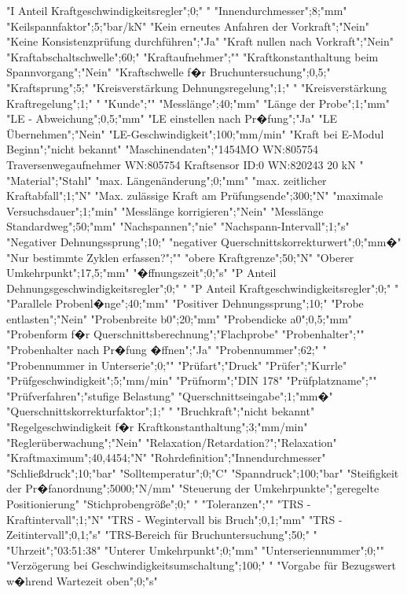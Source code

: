 "I Anteil Kraftgeschwindigkeitsregler";0;" "
"Innendurchmesser";8;"mm"
"Keilspannfaktor";5;"bar/kN"
"Kein erneutes Anfahren der Vorkraft";"Nein"
"Keine Konsistenzprüfung durchführen";"Ja"
"Kraft nullen nach Vorkraft";"Nein"
"Kraftabschaltschwelle";60;"%
"Kraftaufnehmer";""
"Kraftkonstanthaltung beim Spannvorgang";"Nein"
"Kraftschwelle f�r Bruchuntersuchung";0,5;"%
"Kraftsprung";5;"%
"Kreisverstärkung Dehnungsregelung";1;" "
"Kreisverstärkung Kraftregelung";1;" "
"Kunde";""
"Messlänge";40;"mm"
"Länge der Probe";1;"mm"
"LE - Abweichung";0,5;"mm"
"LE einstellen nach Pr�fung";"Ja"
"LE Übernehmen";"Nein"
"LE-Geschwindigkeit";100;"mm/min"
"Kraft bei E-Modul Beginn";"nicht bekannt"
"Maschinendaten";"1454MO WN:805754
Traversenwegaufnehmer WN:805754
Kraftsensor ID:0 WN:820243 20 kN
"
"Material";"Stahl"
"max. Längenänderung";0;"mm"
"max. zeitlicher Kraftabfall";1;"N"
"Max. zulässige Kraft am Prüfungsende";300;"N"
"maximale Versuchsdauer";1;"min"
"Messlänge korrigieren";"Nein"
"Messlänge Standardweg";50;"mm"
"Nachspannen";"nie"
"Nachspann-Intervall";1;"s"
"Negativer Dehnungssprung";10;"%
"negativer Querschnittskorrekturwert";0;"mm�"
"Nur bestimmte Zyklen erfassen?";""
"obere Kraftgrenze";50;"N"
"Oberer Umkehrpunkt";17,5;"mm"
"�ffnungszeit";0;"s"
"P Anteil Dehnungsgeschwindigkeitsregler";0;" "
"P Anteil Kraftgeschwindigkeitsregler";0;" "
"Parallele Probenl�nge";40;"mm"
"Positiver Dehnungssprung";10;"%
"Probe entlasten";"Nein"
"Probenbreite b0";20;"mm"
"Probendicke a0";0,5;"mm"
"Probenform f�r Querschnittsberechnung";"Flachprobe"
"Probenhalter";""
"Probenhalter nach Pr�fung �ffnen";"Ja"
"Probennummer";62;" "
"Probennummer in Unterserie";0;""
"Prüfart";"Druck"
"Prüfer";"Kurrle"
"Prüfgeschwindigkeit";5;"mm/min"
"Prüfnorm";"DIN 178"
"Prüfplatzname";""
"Prüfverfahren";"stufige Belastung"
"Querschnittseingabe";1;"mm�"
"Querschnittskorrekturfaktor";1;" "
"Bruchkraft";"nicht bekannt"
"Regelgeschwindigkeit f�r Kraftkonstanthaltung";3;"mm/min"
"Reglerüberwachung";"Nein"
"Relaxation/Retardation?";"Relaxation"
"Kraftmaximum";40,4454;"N"
"Rohrdefinition";"Innendurchmesser"
"Schließdruck";10;"bar"
"Solltemperatur";0;"C"
"Spanndruck";100;"bar"
"Steifigkeit der Pr�fanordnung";5000;"N/mm"
"Steuerung der Umkehrpunkte";"geregelte Positionierung"
"Stichprobengröße";0;" "
"Toleranzen";""
"TRS - Kraftintervall";1;"N"
"TRS - Wegintervall bis Bruch";0,1;"mm"
"TRS - Zeitintervall";0,1;"s"
"TRS-Bereich für Bruchuntersuchung";50;" "
"Uhrzeit";"03:51:38"
"Unterer Umkehrpunkt";0;"mm"
"Unterseriennummer";0;""
"Verzögerung bei Geschwindigkeitsumschaltung";100;" "
"Vorgabe für Bezugswert w�hrend Wartezeit oben";0;"s"
